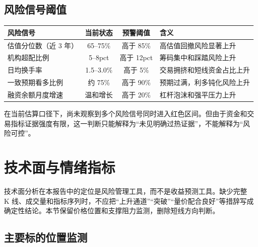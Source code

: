 \subsection{风险信号阈值}

\begin{exhibitbox}[表 9-9：关键风险信号监测表]
\centering
\small
\begin{tabularx}{\exhibitboxwidth}{X c c X}
\toprule
\textbf{风险信号} & \textbf{当前状态} & \textbf{预警阈值} & \textbf{含义} \\
\midrule
估值分位数（近 3 年） & 65--75\% & 高于 85\% & 高估值回撤风险显著上升 \\
机构超配比例 & 5--8pct & 高于 12pct & 筹码集中和踩踏风险上升 \\
日均换手率 & 1.5--3.0\% & 高于 5\% & 交易拥挤和短线资金占比上升 \\
一致预期看多比例 & 约 75\% & 高于 90\% & 预期过满，利多钝化风险上升 \\
融资余额月度增速 & 温和增长 & 高于 20\% & 杠杆泡沫和强平压力上升 \\
\bottomrule
\end{tabularx}
\end{exhibitbox}

在当前估算口径下，尚未观察到多个风险信号同时进入红色区间。但由于资金和交易指标证据强度有限，这一判断只能解释为“未见明确过热证据”，不能解释为“风险可控”。

\section{技术面与情绪指标}

技术面分析在本报告中的定位是风险管理工具，而不是收益预测工具。缺少完整 K 线、成交量和指标序列时，不应把“上升通道”“突破”“量价配合良好”等措辞写成确定性结论。本节保留价格位置和支撑阻力监测，删除短线方向判断。

\subsection{主要标的位置监测}

